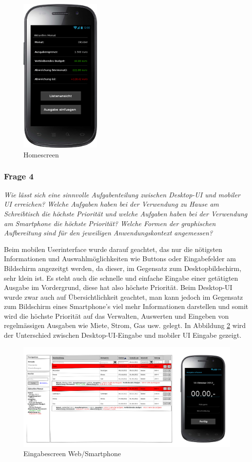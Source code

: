 \begin{figure}[htl]
\centering
\includegraphics[width=4cm]{img/smartphone_homescreen}
\caption{Homescreen}
\label{fig:smartphone_homescreen}
\end{figure}

\newpage
\subsubsection{Frage 4}

\emph{Wie lässt sich eine sinnvolle Aufgabenteilung zwischen Desktop-UI und mobiler UI erreichen?
Welche Aufgaben haben bei der Verwendung zu Hause am Schreibtisch die höchste Priorität und welche
Aufgaben haben bei der Verwendung am Smartphone die höchste Priorität? Welche Formen der graphischen
Aufbereitung sind für den jeweiligen Anwendungskontext angemessen?}

\vspace{2mm}

Beim mobilen Userinterface wurde darauf geachtet, das nur die n\"otigsten Informationen und
Auswahlm\"oglichkeiten wie Buttons oder Eingabefelder am Bildschirm angezeitgt werden, da dieser,
im Gegensatz zum Desktopbildschirm, sehr klein ist. Es steht auch die schnelle und einfache
Eingabe einer get\"atigten Ausgabe im Vordergrund, diese hat also h\"ochste Priorit\"at.
Beim Desktop-UI wurde zwar auch auf \"Ubersichtlichkeit geachtet, man kann jedoch im Gegensatz
zum Bildschirm eines Smartphone's viel mehr Informationen darstellen und somit wird die h\"ochste
Priorit\"at auf das Verwalten, Auswerten und Eingeben von regelm\"assigen Ausgaben wie Miete, Strom,
Gas usw. gelegt. In Abbildung \ref{fig:smartphone_web_comparison} wird der Unterschied zwischen Desktop-UI-Eingabe und mobiler UI Eingabe gezeigt.

\begin{figure}[htl]
\centering
\includegraphics[width=\textwidth]{img/smartphone_web_comparison}
\caption{Eingabescreen Web/Smartphone}
\label{fig:smartphone_web_comparison}
\end{figure}
